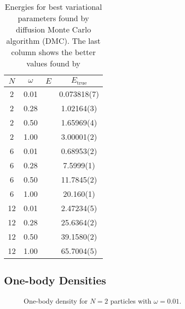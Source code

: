 \documentclass[aps,prb,twocolumn,floatfix]{revtex4}
\begin{document}
\begin{table}
\centering
\begin{tabular}{c c c c}
    \hline
    \hline
    $N$ & $\omega$ & $E$ & $E_{\text{true}}$ \\
    \hline
    2 & 0.01 &  & 0.073818(7) \\
    2 & 0.28 &  & 1.02164(3) \\
    2 & 0.50 &  & 1.65969(4) \\
    2 & 1.00 &  & 3.00001(2) \\
    \hline
    6 & 0.01 &  & 0.68953(2) \\
    6 & 0.28 &  & 7.5999(1) \\
    6 & 0.50 &  & 11.7845(2) \\
    6 & 1.00 &  & 20.160(1) \\
    \hline
    12 & 0.01 &  & 2.47234(5) \\
    12 & 0.28 &  & 25.6364(2) \\
    12 & 0.50 &  & 39.1580(2) \\
    12 & 1.00 &  & 65.7004(5) \\
    \hline
\end{tabular}
\caption{Energies for best variational parameters found by diffusion Monte Carlo algorithm (DMC). The last column shows the better values found by \textcite{sigve}}
\label{tab:diffusiontable}
\end{table}

\subsection{One-body Densities} \label{sec:one-body}


\begin{figure*}
    \centering
    \caption{One-body density for $N=2$ particles with $\omega = 0.01$.}
    \label{fig:density2p-omega0.01}
\end{figure*}
\end{document}
